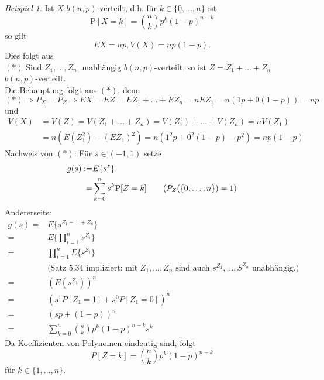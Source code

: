 \documentclass[a4paper,12pt,fleqn]{scrartcl}
\newcommand{\impl}{\Rightarrow}
\theoremstyle{definition}
\theoremstyle{plain}
\theoremstyle{remark}
\newtheorem{beispiel}[definition]{Beispiel}
\begin{document}
\begin{beispiel}
Ist $X$ $b(n,p)$-verteilt, d.h. für $k\in\{ 0,\ldots,n\}$ ist
\[\text{P}[X=k]=\binom{n}{k}p^k(1-p)^{n-k}\]
so gilt
\[EX=np,V(X)=np(1-p).\]
Dies folgt aus\\
$(*)$ Sind $Z_1,\ldots,Z_n$ unabhängig $b(n,p)$-verteilt, so ist $Z=Z_1+\ldots+Z_n$ $b(n,p)$-verteilt.\\
Die Behauptung folgt aus $(*)$, denn
\[(*)\impl P_X=P_Z\impl EX=EZ=EZ_1+\ldots+EZ_n=nEZ_1=n(1p+0(1-p))=np\]
und
\begin{align*}
V(X)&=V(Z)=V(Z_1+\ldots+Z_n)=V(Z_1)+\ldots+V(Z_n)=nV(Z_1)\\&=n(E(Z_1^2)-(EZ_1)^2)=n(1^2p+0^2(1-p)-p^2)=np(1-p)
\end{align*}
Nachweis von $(*)$: Für $s\in(-1,1)$ setze
\begin{align*}
g(s):=&E\{ s^z\} \\
=&\sum_{k=0}^ns^k\text{P}[Z=k] \tag{$P_Z(\{ 0,\ldots,n\})=1$}
\end{align*}
Andererseits:
\begin{align*}
g(s)=&E\{ s^{Z_1+\ldots+Z_n}\}\\
=&E\{\prod_{i=1}^ns^{Z_i}\}\\
=&\prod_{i=1}^nE\{ s^{Z_i}\}\\
&\text{(Satz 5.34 impliziert: mit }Z_1,\ldots,Z_n\text{ sind auch }s^{Z_1},\ldots,S^{Z_n}\text{ unabhängig.)}\\
=&(E(s^{Z_1}))^n\\
=&(s^1P[Z_1=1]+s^0P[Z_1=0])^n\\
=&(sp+(1-p))^n\\
=&\sum_{k=0}^n\binom{n}{k}p^k(1-p)^{n-k}s^k
\end{align*}
Da Koeffizienten von Polynomen eindeutig sind, folgt
\[P[Z=k]=\binom{n}{k}p^k(1-p)^{n-k}\]
für $k\in\{1,\ldots,n\}$.
\end{beispiel}

\end{document}
